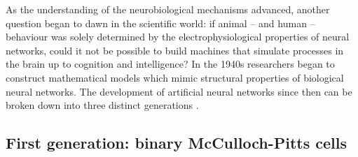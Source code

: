 As the understanding of the neurobiological mechanisms advanced, another question began to dawn in the scientific world: if animal -- and human -- behaviour was solely determined by the electrophysiological properties of neural networks, could it not be possible to build machines that simulate processes in the brain up to cognition and intelligence? In the 1940s researchers began to construct mathematical models which mimic structural properties of biological neural networks. The development of artificial neural networks since then can be broken down into three distinct generations \cite{maass1997networks}.

\subsection{First generation: binary McCulloch-Pitts cells}
\label{sec:mcculloch_pitts_neuron}

